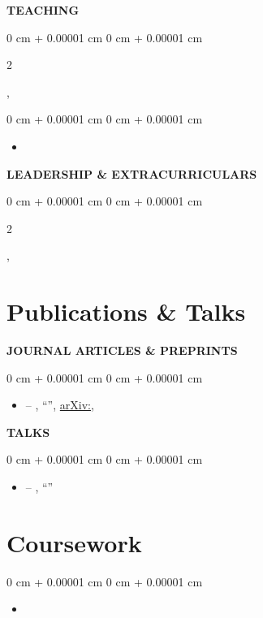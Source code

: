 \documentclass[10pt, letterpaper]{article}
\newenvironment{highlights}{
    \begin{itemize}[
        topsep=0.10 cm,
        parsep=0.10 cm,
        partopsep=0pt,
        itemsep=0pt,
        leftmargin=0 cm + 10pt
    ]
}{
    \end{itemize}
} %
\newenvironment{onecolentry}{
    \begin{adjustwidth}{
        0 cm + 0.00001 cm
    }{
        0 cm + 0.00001 cm
    }
}{
    \end{adjustwidth}
} %
\newenvironment{twocolentry}[2][]{
    \onecolentry
    \def\secondColumn{#2}
    \setcolumnwidth{\fill, 4.5 cm}
    \begin{paracol}{2}
}{
    \switchcolumn \raggedleft \secondColumn
    \end{paracol}
    \endonecolentry
} %
\begin{document}
\vspace{0.2cm}
\textbf{TEACHING}
\begin{twocolentry}{}
    \textbf{}, 
\end{twocolentry}
\begin{onecolentry}
\begin{highlights}
\item {}
\end{highlights}
\end{onecolentry}

\vspace{0.2cm}
\textbf{LEADERSHIP \& EXTRACURRICULARS}
\begin{twocolentry}{}
    , \emph{}
\end{twocolentry}

\section{Publications \& Talks}
\textbf{\MakeUppercase{Journal Articles \& Preprints}}
\begin{onecolentry}
\begin{highlights}
 \item {} -- , ``'', \href{https://arxiv.org/abs/\VAR{pub.arxiv}}{arXiv:}, 
\end{highlights}
\end{onecolentry}

\vspace{0.2cm}
\textbf{\MakeUppercase{Talks}}
\begin{onecolentry}
\begin{highlights}
\item {} -- , ``''
\end{highlights}
\end{onecolentry}

\section{Coursework}
\begin{onecolentry}
\begin{highlights}
    \item {}
\end{highlights}
\end{onecolentry}
\end{document}
